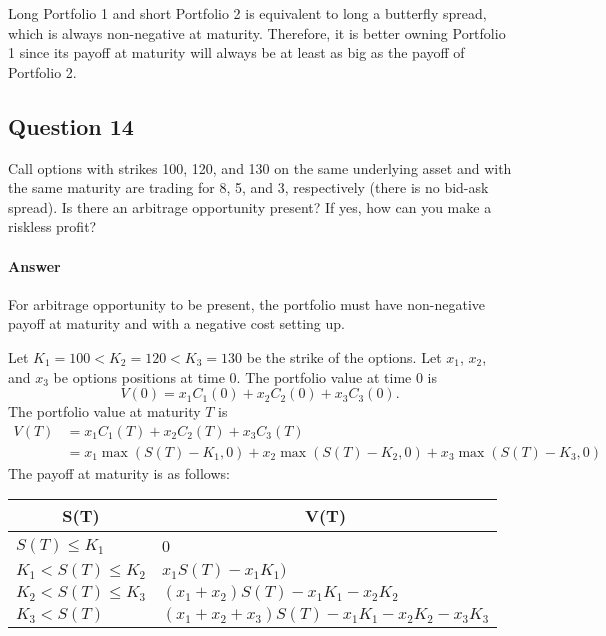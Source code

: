 Long Portfolio 1 and short Portfolio 2 is equivalent to long a butterfly
    spread, which is always non-negative at maturity.
Therefore, it is better owning Portfolio 1 since its payoff at maturity will
    always be at least as big as the payoff of Portfolio 2.

\subsection{Question 14}
Call options with strikes 100, 120, and 130 on the same underlying asset and
    with the same maturity are trading for 8, 5, and 3, respectively (there is
    no bid-ask spread).
Is there an arbitrage opportunity present?
If yes, how can you make a riskless profit?

\paragraph{Answer}
For arbitrage opportunity to be present, the portfolio must have non-negative
    payoff at maturity and with a negative cost setting up.

Let $ K_1 = 100 < K_2 = 120 < K_3 = 130 $ be the strike of the options.
Let $ x_1 $, $ x_2 $, and $ x_3 $ be options positions at time 0.
The portfolio value at time 0 is
\begin{equation*}
    V(0) = x_1 C_1(0) + x_2 C_2(0) + x_3 C_3(0).
\end{equation*}
The portfolio value at maturity $ T $ is
\begin{align*}
    V(T) &= x_1 C_1(T) + x_2 C_2(T) + x_3 C_3(T) \\
         &= x_1 \max (S(T) - K_1, 0) + x_2 \max (S(T) - K_2, 0) +
            x_3 \max(S(T) - K_3, 0)
\end{align*}
The payoff at maturity is as follows:
\begin{table}
    \begin{center}
        \begin{tabular}[c]{l|l}
            \hline
            \multicolumn{1}{c|}{\textbf{S(T)}} &
            \multicolumn{1}{c}{\textbf{V(T)}} \\
            \hline
            $ S(T) \leq K_1 $ & 0 \\
            $ K_1 < S(T) \leq K_2 $ & $ x_1 S(T) - x_1 K_1) $  \\
            $ K_2 < S(T) \leq K_3 $ & $ (x_1 + x_2) S(T) - x_1 K_1 -
                x_2 K_2 $ \\
            $ K_3 < S(T) $ & $ (x_1 + x_2 + x_3) S(T) - x_1 K_1 -
                x_2 K_2 - x_3 K_3 $\\
            \hline
        \end{tabular}
    \end{center}
\end{table}

